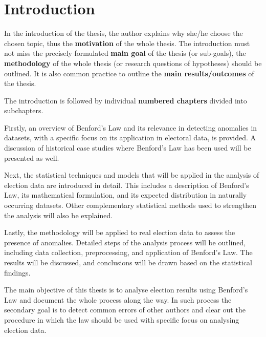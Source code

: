 \chapter*{Introduction}

\begin{koment}
In the introduction of the thesis, the author explains why she/he choose the 
chosen topic, thus the \textbf{motivation} of the whole thesis. The introduction must not 
miss the precisely formulated \textbf{main goal} of the thesis (or sub-goals), the 
\textbf{methodology} of the whole thesis (or research questions of hypotheses) should be 
outlined. It is also common practice to outline the \textbf{main results/outcomes} of the 
thesis.

The introduction is followed by individual \textbf{numbered chapters} divided into 
subchapters.

Firstly, an overview of Benford’s Law and its relevance in detecting anomalies in datasets, with a specific focus on its application in electoral data, is provided. A discussion of historical case studies where Benford’s Law has been used will be presented as well.

Next, the statistical techniques and models that will be applied in the analysis of election data are introduced in detail. This includes a description of Benford's Law, its mathematical formulation, and its expected distribution in naturally occurring datasets. Other complementary statistical methods used to strengthen the analysis will also be explained.

Lastly, the methodology will be applied to real election data to assess the presence of anomalies. Detailed steps of the analysis process will be outlined, including data collection, preprocessing, and application of Benford's Law. The results will be discussed, and conclusions will be drawn based on the statistical findings.
\end{koment}

The main objective of this thesis is to analyse election results using Benford's Law and document the whole process along the way. In such process the secondary goal is to detect common errors of other authors and clear out the procedure in which the law should be used with specific focus on analysing election data. 

